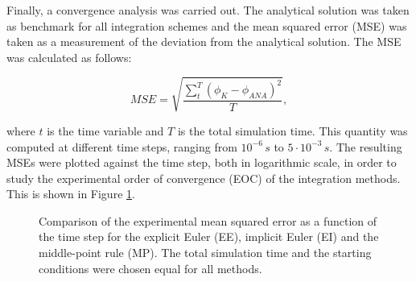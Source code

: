 \documentclass[12pt,bibstyle=none,pagenumberinfooter]{ifmdocument}
\begin{document}
Finally, a convergence analysis was carried out. The analytical solution was taken as benchmark for all integration schemes and the mean squared error (MSE) was taken as a measurement of the deviation from the analytical solution. The MSE was calculated as follows:

\begin{equation}
    MSE = \sqrt{\frac{\displaystyle \sum_{t}^T \left(\phi_{K} - \phi_{ANA}\right)^2}{T}},
    \label{eq: MSE}
\end{equation}

where $t$ is the time variable and $T$ is the total simulation time. This quantity was computed at different time steps, ranging from $10^{-6} \, s$ to $5\cdot 10^{-3} \,s$. The resulting MSEs were plotted against the time step, both in logarithmic scale, in order to study the experimental order of convergence (EOC) of the integration methods. This is shown in Figure \ref{fig: ConvergencePlot}.


\begin{figure}[h]
    \centering
    
    \caption{Comparison  of the experimental mean squared error as a function of the time step for the explicit Euler (EE), implicit Euler (EI) and the middle-point rule (MP). The total simulation time and the starting conditions were chosen equal for all methods.}
    \label{fig: ConvergencePlot}
\end{figure}
\end{document}
